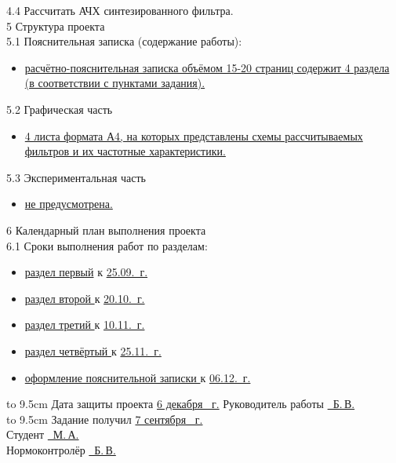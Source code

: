 4.4 Рассчитать АЧХ синтезированного фильтра.\\
5 Структура проекта\\
5.1 Пояснительная записка (содержание работы):
\begin{itemize}
\item \uline{расчётно-пояснительная записка объёмом 15-20 страниц
    со\-держит 4 раздела (в соответствии с пунктами
    задания). \hfill \quad}
\end{itemize}
5.2 Графическая часть
\begin{itemize}
\item \uline{4 листа формата А4, на которых представлены схемы
    рас\-считываемых фильтров и их частотные характеристики.\hfill}
\end{itemize}
5.3 Экспериментальная часть
\begin{itemize}
\item \uline{не предусмотрена.\hfill}
\end{itemize}
6 Календарный план выполнения проекта\\
6.1 Сроки выполнения работ по разделам:
\begin{itemize}
\item \uline{раздел первый\hfill}
  к \uline{25.09.\the\year~г. }
\item \uline{раздел второй \hfill} к \uline{20.10.\the\year~г.}
\item \uline{раздел третий \hfill} к \uline{10.11.\the\year~г.}
\item \uline{раздел четвёртый \hfill} к \uline{25.11.\the\year~г.}
\item \uline{оформление пояснительной записки \hfill} к \uline{06.12.\the\year~г.}

\end{itemize}
\hbox to 9.5cm {Дата защиты проекта \uline{\hfill 6 декабря \the\year~г.}}
Руководитель работы \uline{~Б.\,В.}\\
\hbox to 9.5cm {Задание получил \uline{\hfill7 сентября \the\year~г.}}\\
Студент    \uline{~М.\,А.}\\
Нормоконтролёр    \uline{~Б.\,В.}\\
\newpage

